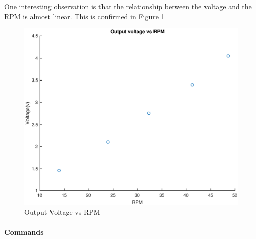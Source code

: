 \documentclass[a4paper]{article}
\begin{document}



One interesting observation is that the relationship between the voltage and the 
RPM is almost linear. This is confirmed in Figure \ref{graph: Output Voltage vs RPM}



 \begin{figure}[H]
    \centering
      \includegraphics[scale=0.4]{./media/voltagevsrpm.eps}
   \caption{Output Voltage vs RPM}
   \label{graph: Output Voltage vs RPM}
\end{figure}




\paragraph*{Commands}
\vspace{-6pt}
\end{document}
